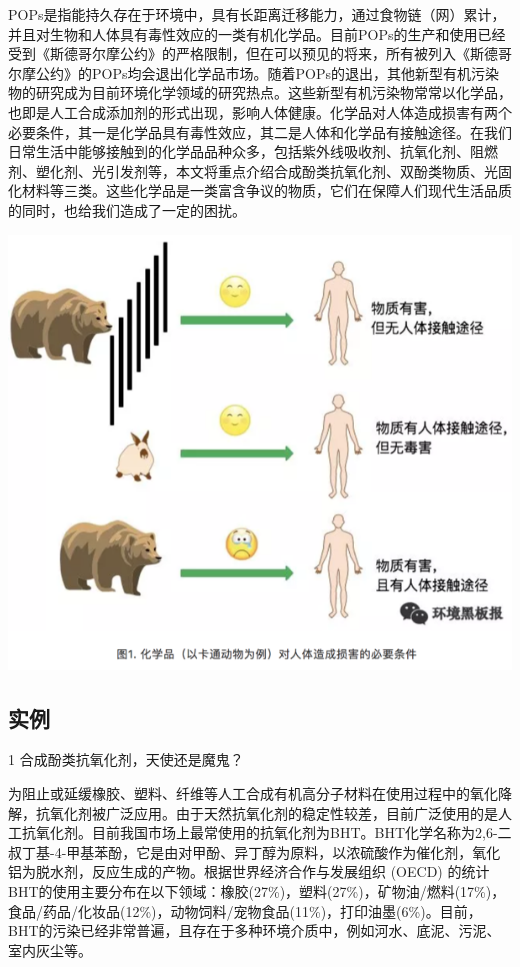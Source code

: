 \documentclass[
]{book}
\begin{document}
POPs是指能持久存在于环境中，具有长距离迁移能力，通过食物链（网）累计，并且对生物和人体具有毒性效应的一类有机化学品。目前POPs的生产和使用已经受到《斯德哥尔摩公约》的严格限制，但在可以预见的将来，所有被列入《斯德哥尔摩公约》的POPs均会退出化学品市场。随着POPs的退出，其他新型有机污染物的研究成为目前环境化学领域的研究热点。这些新型有机污染物常常以化学品，也即是人工合成添加剂的形式出现，影响人体健康。化学品对人体造成损害有两个必要条件，其一是化学品具有毒性效应，其二是人体和化学品有接触途径。在我们日常生活中能够接触到的化学品品种众多，包括紫外线吸收剂、抗氧化剂、阻燃剂、塑化剂、光引发剂等，本文将重点介绍合成酚类抗氧化剂、双酚类物质、光固化材料等三类。这些化学品是一类富含争议的物质，它们在保障人们现代生活品质的同时，也给我们造成了一定的困扰。

\includegraphics[width=8.33in]{images/epc1}

\hypertarget{ux5b9eux4f8b}{%
\subsection{实例}\label{ux5b9eux4f8b}}

1 合成酚类抗氧化剂，天使还是魔鬼？

为阻止或延缓橡胶、塑料、纤维等人工合成有机高分子材料在使用过程中的氧化降解，抗氧化剂被广泛应用。由于天然抗氧化剂的稳定性较差，目前广泛使用的是人工抗氧化剂。目前我国市场上最常使用的抗氧化剂为BHT。BHT化学名称为2,6-二叔丁基-4-甲基苯酚，它是由对甲酚、异丁醇为原料，以浓硫酸作为催化剂，氧化铝为脱水剂，反应生成的产物。根据世界经济合作与发展组织 (OECD) 的统计BHT的使用主要分布在以下领域：橡胶(27\%)，塑料(27\%)，矿物油/燃料(17\%)，食品/药品/化妆品(12\%)，动物饲料/宠物食品(11\%)，打印油墨(6\%)。目前，BHT的污染已经非常普遍，且存在于多种环境介质中，例如河水、底泥、污泥、室内灰尘等。
\end{document}
